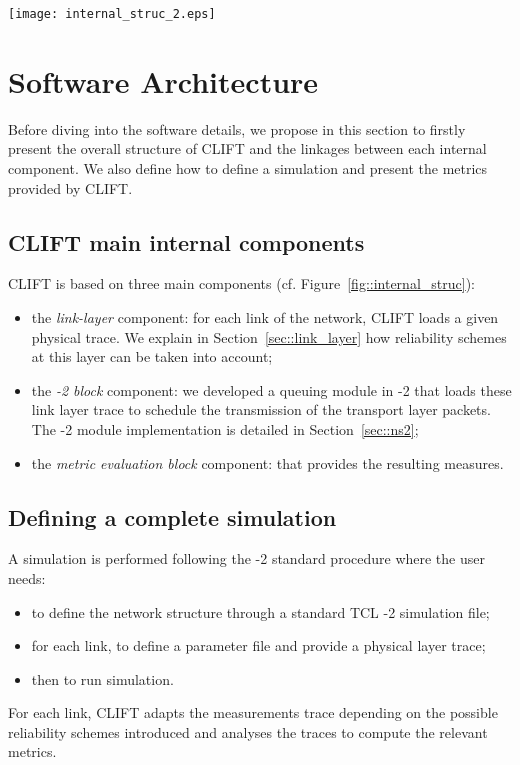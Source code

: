 \documentclass[conference,letterpaper]{IEEEtran}
\begin{document}
\begin{figure*}[!htb]
    \begin{center}
	\texttt{[image: internal\_struc\_2.eps]}
	\caption{Structure of software}
	\label{fig::internal_struc}
    \end{center}
\end{figure*}

\section{Software Architecture}
\label{sec::arch_soft}

Before diving into the software details, we propose in this section to firstly present the overall structure of CLIFT and the linkages between each internal component. We also define how to define a simulation and present the metrics provided by CLIFT. 

\subsection{CLIFT main internal components}
\label{sec::arch_soft_achievements}

CLIFT is based on three main components (cf. Figure~\ref{fig::internal_struc}): 

\begin{itemize}
\item the \textit{link-layer} component: for each link of the network, CLIFT loads a given physical trace. We explain in Section~\ref{sec::link_layer} how reliability schemes at this layer can be taken into account;
\item the \textit{-2 block} component: we developed a queuing module in -2 that loads these link layer trace to schedule the transmission of the transport layer packets. The -2 module implementation is detailed in Section~\ref{sec::ns2};
\item the \textit{metric evaluation block} component: that provides the resulting measures.
\end{itemize}

\subsection{Defining a complete simulation}
\label{subsec::arch_soft_complete_simu}
A simulation is performed following the -2 standard procedure where the user needs: 
\begin{itemize}
\item to define the network structure through a standard TCL -2 simulation file;
\item for each link, to define a parameter file and provide a physical layer trace;
\item then to run  simulation.
\end{itemize}
For each link, CLIFT adapts the measurements trace depending on the possible reliability schemes introduced and analyses the traces
to compute the relevant metrics.
\end{document}
